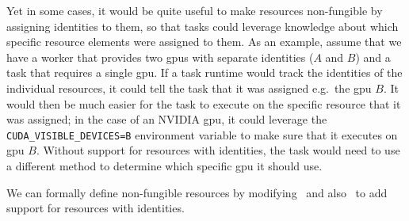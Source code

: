 Yet in some cases, it would be quite useful to make resources non-fungible by assigning identities
to them, so that tasks could leverage knowledge about which specific resource elements were
assigned to them. As an example, assume that we have a worker that provides two
\glspl{gpu} with separate identities ($A$ and
$B$) and a task that requires a single \gls{gpu}. If a task
runtime would track the identities of the individual resources, it could tell the task that it was
assigned e.g.\ the \gls{gpu} $B$. It would then be much easier for
the task to execute on the specific resource that it was assigned; in the case of an NVIDIA
\gls{gpu}, it could leverage the \texttt{CUDA\_VISIBLE\_DEVICES=B} environment variable to make
sure that it executes on \gls{gpu} $B$. Without support for
resources with identities, the task would need to use a different method to determine which
specific \gls{gpu} it should use.

We can formally define non-fungible resources by modifying~ and
also~ to add support for resources with identities.

